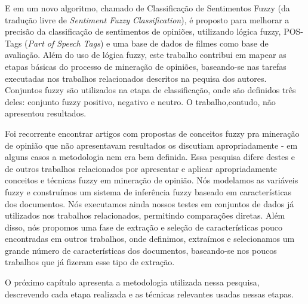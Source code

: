 \documentclass[template.tex]{subfiles}
\begin{document}
E em  um novo algoritmo, chamado de Classificação de Sentimentos Fuzzy (da tradução livre de \textit{Sentiment Fuzzy Classification}), é proposto para melhorar a precisão da classificação de sentimentos de opiniões, utilizando lógica fuzzy, POS-Tags (\textit{Part of Speech Tags}) e uma base de dados de filmes como base de avaliação. Além do uso de lógica fuzzy, este trabalho contribui em mapear as etapas básicas do processo de mineração de opiniões, baseando-se nas tarefas executadas nos trabalhos relacionados descritos na pequisa dos autores. Conjuntos fuzzy são utilizados na etapa de classificação, onde são definidos três deles: conjunto fuzzy positivo, negativo e neutro. O trabalho,contudo, não apresentou resultados. 

Foi recorrente encontrar artigos com propostas de conceitos fuzzy pra mineração de opinião que não apresentavam resultados os discutiam apropriadamente - em alguns casos a metodologia nem era bem definida. Essa pesquisa difere destes e de outros trabalhos relacionados por apresentar e aplicar apropriadamente conceitos e técnicas fuzzy em mineração de opinião. Nós modelamos as variáveis fuzzy e construímos um sistema de inferência fuzzy baseado em características dos documentos. Nós executamos ainda nossos testes em conjuntos de dados já utilizados nos trabalhos relacionados, permitindo comparações diretas. Além disso, nós propomos uma fase de extração e seleção de características pouco encontradas em outros trabalhos, onde definimos, extraímos e selecionamos um grande número de características dos documentos, baseando-se nos poucos trabalhos que já fizeram esse tipo de extração.

O próximo capítulo apresenta a metodologia utilizada nessa pesquisa, descrevendo cada etapa realizada e as técnicas relevantes usadas nessas etapas.

\end{document}
